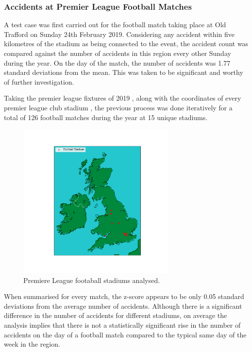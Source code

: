 \documentclass[12pt]{article}
\begin{document}
\subsubsection{Accidents at Premier League Football Matches}

A test case was first carried out for the football match taking place at Old Trafford on Sunday 24th February 2019. Considering any accident within five kilometres of the stadium as being connected to the event, the accident count was compared against the number of accidents in this region every other Sunday during the year. On the day of the match, the number of accidents was 1.77 standard deviations from the mean. This was taken to be significant and worthy of further investigation.

Taking the premier league fixtures of 2019 \parencite{fixtures}, along with the coordinates of every premier league club stadium \parencite{stadiums}, the previous process was done iteratively for a total of 126 football matches during the year at 15 unique stadiums.

\begin{figure}[h]
\centering     %
\includegraphics[width=0.70\textwidth]{stadiums}
\caption{Premiere League footaball stadiums analysed.}
\end{figure}

When summarised for every match, the z-score appears to be only 0.05 standard deviations from the average number of accidents. Although there is a significant difference in the number of accidents for different stadiums, on average the analysis implies that there is not a statistically significant rise in the number of accidents on the day of a football match compared to the typical same day of the week in the region.
\end{document}
